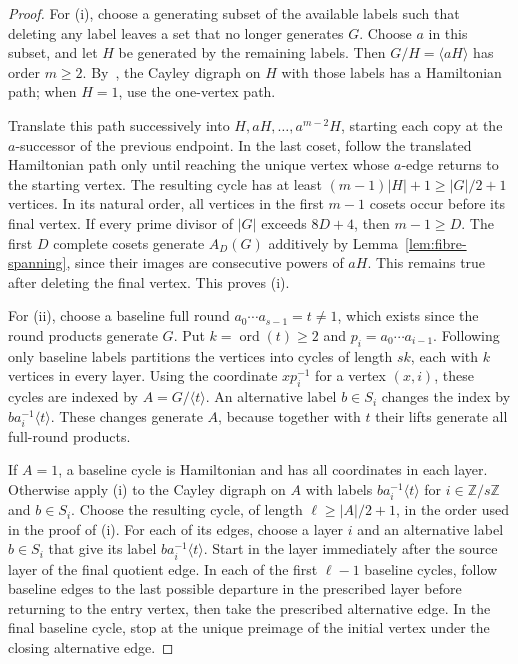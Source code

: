 \documentclass[11pt,a4paper,reqno]{amsart}
\theoremstyle{definition}
\theoremstyle{remark}
\numberwithin{equation}{section}
\DeclareMathOperator{\ord}{ord}
\newcommand{\Z}{\mathbb Z}
\newcommand{\gen}[1]{\langle #1\rangle}
\begin{document}
\begin{proof}
For (i), choose a generating subset of the available labels such that deleting any label leaves a set that no longer generates $G$. Choose $a$ in this subset, and let $H$ be generated by the remaining labels. Then $G/H=\gen{aH}$ has order $m\ge2$. By~\cite[Lemma 2.1]{Morris}, the Cayley digraph on $H$ with those labels has a Hamiltonian path; when $H=1$, use the one-vertex path.

Translate this path successively into $H,aH,\ldots,a^{m-2}H$, starting each copy at the $a$-successor of the previous endpoint. In the last coset, follow the translated Hamiltonian path only until reaching the unique vertex whose $a$-edge returns to the starting vertex. The resulting cycle has at least $(m-1)|H|+1\ge |G|/2+1$ vertices. In its natural order, all vertices in the first $m-1$ cosets occur before its final vertex. If every prime divisor of $|G|$ exceeds $8D+4$, then $m-1\ge D$. The first $D$ complete cosets generate $A_D(G)$ additively by Lemma~\ref{lem:fibre-spanning}, since their images are consecutive powers of $aH$. This remains true after deleting the final vertex. This proves (i).

For (ii), choose a baseline full round $a_0\cdots a_{s-1}=t\ne1$, which exists since the round products generate $G$. Put $k=\ord(t)\ge2$ and $p_i=a_0\cdots a_{i-1}$. Following only baseline labels partitions the vertices into cycles of length $sk$, each with $k$ vertices in every layer. Using the coordinate $xp_i^{-1}$ for a vertex $(x,i)$, these cycles are indexed by $A=G/\gen t$. An alternative label $b\in S_i$ changes the index by $ba_i^{-1}\gen t$. These changes generate $A$, because together with $t$ their lifts generate all full-round products.

If $A=1$, a baseline cycle is Hamiltonian and has all coordinates in each layer. Otherwise apply (i) to the Cayley digraph on $A$ with labels $ba_i^{-1}\gen t$ for $i\in\Z/s\Z$ and $b\in S_i$. Choose the resulting cycle, of length $\ell\ge |A|/2+1$, in the order used in the proof of (i). For each of its edges, choose a layer $i$ and an alternative label $b\in S_i$ that give its label $ba_i^{-1}\gen t$. Start in the layer immediately after the source layer of the final quotient edge. In each of the first $\ell-1$ baseline cycles, follow baseline edges to the last possible departure in the prescribed layer before returning to the entry vertex, then take the prescribed alternative edge. In the final baseline cycle, stop at the unique preimage of the initial vertex under the closing alternative edge.


\end{proof}
\end{document}

